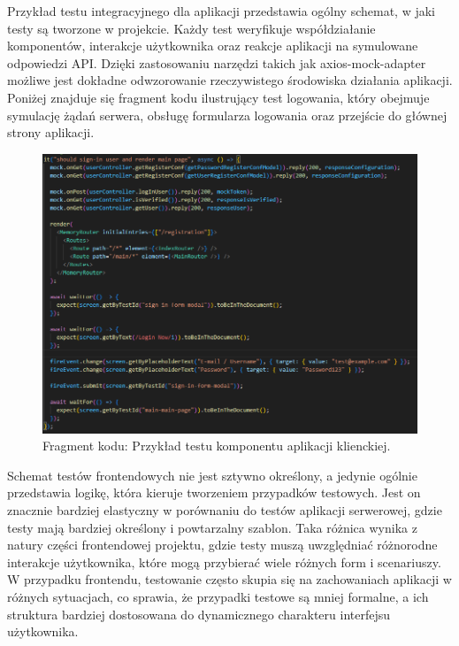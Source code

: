 \documentclass[twoside]{projektInzynierskiMS1}
\begin{document}
\newpage

\noindent
Przykład testu integracyjnego dla aplikacji przedstawia ogólny schemat, w jaki testy są tworzone w projekcie. Każdy test weryfikuje współdziałanie komponentów, interakcje użytkownika oraz reakcje aplikacji na symulowane odpowiedzi API. Dzięki zastosowaniu narzędzi takich jak axios-mock-adapter możliwe jest dokładne odwzorowanie rzeczywistego środowiska działania aplikacji. Poniżej znajduje się fragment kodu ilustrujący test logowania, który obejmuje symulację żądań serwera, obsługę formularza logowania oraz przejście do głównej strony aplikacji.

\vspace{0.5cm}
\begin{figure}[h!]
    \centering
    \includegraphics[width=1\textwidth]{images/ex_front_tests.png}
    \caption{Fragment kodu: Przykład testu komponentu aplikacji klienckiej.}
\end{figure}
\vspace{0.5cm}

\noindent
Schemat testów frontendowych nie jest sztywno określony, a jedynie ogólnie przedstawia logikę, która kieruje tworzeniem przypadków testowych. Jest on znacznie bardziej elastyczny w porównaniu do testów aplikacji serwerowej, gdzie testy mają bardziej określony i powtarzalny szablon. Taka różnica wynika z natury części frontendowej projektu, gdzie testy muszą uwzględniać różnorodne interakcje użytkownika, które mogą przybierać wiele różnych form i scenariuszy. W przypadku frontendu, testowanie często skupia się na zachowaniach aplikacji w różnych sytuacjach, co sprawia, że przypadki testowe są mniej formalne, a ich struktura bardziej dostosowana do dynamicznego charakteru interfejsu użytkownika.
\end{document}
